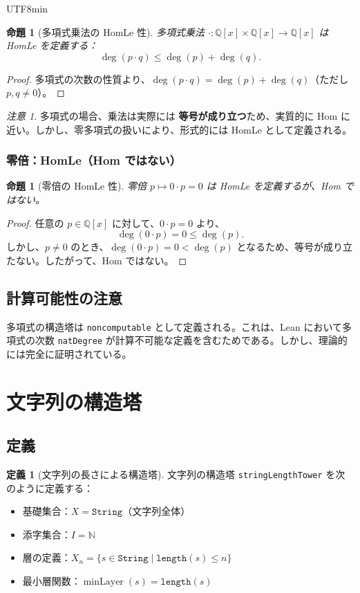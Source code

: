 \documentclass[12pt,a4paper]{article}
\newtheorem{proposition}[theorem]{命題}
\theoremstyle{definition}
\newtheorem{definition}[theorem]{定義}
\theoremstyle{remark}
\newtheorem{remark}[theorem]{注意}
\newcommand{\N}{\mathbb{N}}
\newcommand{\Q}{\mathbb{Q}}
\DeclareMathOperator{\minLayer}{minLayer}
\begin{document}
\begin{CJK}{UTF8}{min}
\begin{proposition}[多項式乗法の HomLe 性]
多項式乗法 $\cdot: \Q[x] \times \Q[x] \to \Q[x]$ は HomLe を定義する：
$$\deg(p \cdot q) \leq \deg(p) + \deg(q).$$
\end{proposition}

\begin{proof}
多項式の次数の性質より、$\deg(p \cdot q) = \deg(p) + \deg(q)$（ただし $p, q \neq 0$）。
\end{proof}

\begin{remark}
多項式の場合、乗法は実際には \textbf{等号が成り立つ}ため、実質的に Hom に近い。しかし、零多項式の扱いにより、形式的には HomLe として定義される。
\end{remark}

\subsubsection{零倍：HomLe（Hom ではない）}

\begin{proposition}[零倍の HomLe 性]
零倍 $p \mapsto 0 \cdot p = 0$ は HomLe を定義するが、Hom ではない。
\end{proposition}

\begin{proof}
任意の $p \in \Q[x]$ に対して、$0 \cdot p = 0$ より、
$$\deg(0 \cdot p) = 0 \leq \deg(p).$$
しかし、$p \neq 0$ のとき、$\deg(0 \cdot p) = 0 < \deg(p)$ となるため、等号が成り立たない。したがって、Hom ではない。
\end{proof}

\subsection{計算可能性の注意}

多項式の構造塔は \texttt{noncomputable} として定義される。これは、Lean において多項式の次数 \texttt{natDegree} が計算不可能な定義を含むためである。しかし、理論的には完全に証明されている。

\section{文字列の構造塔}

\subsection{定義}

\begin{definition}[文字列の長さによる構造塔]
文字列の構造塔 \texttt{stringLengthTower} を次のように定義する：
\begin{itemize}
\item 基礎集合：$X = \texttt{String}$（文字列全体）
\item 添字集合：$I = \N$
\item 層の定義：$X_n = \{s \in \texttt{String} \mid \texttt{length}(s) \leq n\}$
\item 最小層関数：$\minLayer(s) = \texttt{length}(s)$
\end{itemize}
\end{definition}


\end{CJK}
\end{document}
